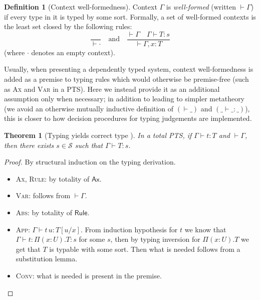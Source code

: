 \documentclass{article}
\newtheorem{theorem}{Theorem}
\theoremstyle{definition}
\newtheorem{definition}{Definition}
\theoremstyle{remark}
\begin{document}
\begin{definition}[Context well-formedness]
    Context $\Gamma$ is \emph{well-formed} (written
    $\vdash\Gamma$) if every type in it is typed by
    some sort. Formally, a set of well-formed contexts
    is the least set closed by the following rules:
    \[
        \dfrac{ }{\vdash\cdot} \quad\text{and}\quad
        \dfrac{\vdash\Gamma\quad\Gamma\vdash T:s}
              {\vdash\Gamma,x:T}
    \]
    (where $\cdot$ denotes an empty context).
\end{definition}

Usually, when presenting a dependently typed system,
context well-formedness is added as a premise to typing
rules which would otherwise be premise-free (such as
\textsc{Ax} and \textsc{Var} in a PTS). Here we instead
provide it as an additional assumption only when
necessary; in addition to leading to simpler metatheory
(we avoid an otherwise mutually inductive definition of
$(\vdash\_)$ and $(\_\vdash\_:\_)$), this is closer to
how decision procedures for typing judgements are
implemented.

\begin{theorem}[Typing yields correct type ]
\label{type-is-correct}
    In a total PTS, if $\Gamma\vdash t:T$ and
    $\vdash\Gamma$, then there exists $s\in\mathcal{S}$
    such that $\Gamma\vdash T:s$.
\end{theorem}
\begin{proof}
    By structural induction on the typing derivation.
    \begin{itemize}
    \item \textsc{Ax}, \textsc{Rule}: by totality of
        $\mathsf{Ax}$.
    \item \textsc{Var}: follows from $\vdash\Gamma$.
    \item \textsc{Abs}: by totality of $\mathsf{Rule}$.
    \item \textsc{App}: $\Gamma\vdash t\,u:T[u/x]$.
        From induction hypothesis for $t$ we know that
        $\Gamma\vdash t:\Pi(x:U).T:s$ for some $s$,
        then by typing inversion for $\Pi(x:U).T$ we
        get that $T$ is typable with some sort. Then
        what is needed follows from a substitution
        lemma.
    \item \textsc{Conv}: what is needed is present in
        the premise.
    \end{itemize}
\end{proof}
\end{document}

